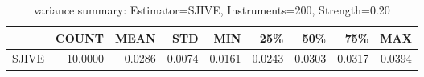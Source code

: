 \begin{table}[ht]
\centering
\caption{variance summary: Estimator=SJIVE, Instruments=200, Strength=0.20}
\begin{tabular}{lrrrrrrrr}
\toprule
 & COUNT & MEAN & STD & MIN & 25\% & 50\% & 75\% & MAX \\
\midrule
SJIVE & 10.0000 & 0.0286 & 0.0074 & 0.0161 & 0.0243 & 0.0303 & 0.0317 & 0.0394 \\
\bottomrule
\end{tabular}
\end{table}
